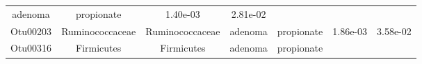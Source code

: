 \documentclass[11pt,]{article}
\begin{document}
\begin{longtable}[]{@{}ccccccc@{}}
\begin{minipage}[t]{0.09\columnwidth}
adenoma\strut
\end{minipage} & \begin{minipage}[t]{0.11\columnwidth}\centering\strut
propionate\strut
\end{minipage} & \begin{minipage}[t]{0.09\columnwidth}\centering\strut
1.40e-03\strut
\end{minipage} & \begin{minipage}[t]{0.09\columnwidth}\centering\strut
2.81e-02\strut
\end{minipage}\tabularnewline
\begin{minipage}[t]{0.09\columnwidth}\centering\strut
Otu00203\strut
\end{minipage} & \begin{minipage}[t]{0.17\columnwidth}\centering\strut
Ruminococcaceae\strut
\end{minipage} & \begin{minipage}[t]{0.17\columnwidth}\centering\strut
Ruminococcaceae\strut
\end{minipage} & \begin{minipage}[t]{0.09\columnwidth}\centering\strut
adenoma\strut
\end{minipage} & \begin{minipage}[t]{0.11\columnwidth}\centering\strut
propionate\strut
\end{minipage} & \begin{minipage}[t]{0.09\columnwidth}\centering\strut
1.86e-03\strut
\end{minipage} & \begin{minipage}[t]{0.09\columnwidth}\centering\strut
3.58e-02\strut
\end{minipage}\tabularnewline
\begin{minipage}[t]{0.09\columnwidth}\centering\strut
Otu00316\strut
\end{minipage} & \begin{minipage}[t]{0.17\columnwidth}\centering\strut
Firmicutes\strut
\end{minipage} & \begin{minipage}[t]{0.17\columnwidth}\centering\strut
Firmicutes\strut
\end{minipage} & \begin{minipage}[t]{0.09\columnwidth}\centering\strut
adenoma\strut
\end{minipage} & \begin{minipage}[t]{0.11\columnwidth}\centering\strut
propionate\strut
\end{minipage} & \begin{minipage}[t]{0.09\columnwidth}\centering\strut

\end{minipage}
\end{longtable}
\end{document}
